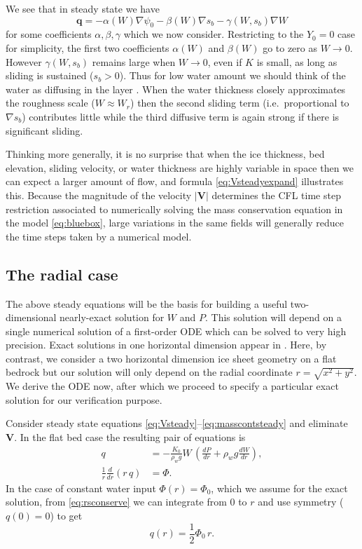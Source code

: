 \documentclass[11pt,final]{amsart}%
\newcommand\bV{\mathbf{V}}
\newcommand\bq{\mathbf{q}}
\newcommand{\grad}{\nabla}
\begin{document}
We see that in steady state we have
\begin{equation}
\bq = - \alpha(W) \grad \psi_0 - \beta(W) \grad s_b - \gamma(W,s_b) \grad W  \label{eq:qabstract}
\end{equation}
for some coefficients $\alpha,\beta,\gamma$ which we now consider.  Restricting to the $Y_0=0$ case for simplicity, the first two coefficients $\alpha(W)$ and $\beta(W)$ go to zero as $W\to 0$.  However $\gamma(W,s_b)$ remains large when $W\to 0$, even if $K$ is small, as long as sliding is sustained ($s_b > 0$).  Thus for low water amount we should think of the water as diffusing in the layer \citep[compare equation (11) in][]{BBssasliding}.  When the water thickness closely approximates the roughness scale ($W\approx W_r$) then the second sliding term (i.e.~proportional to $\grad s_b$) contributes little while the third diffusive term is again strong if there is significant sliding.

Thinking more generally, it is no surprise that when the ice thickness, bed elevation, sliding velocity, or water thickness are highly variable in space then we can expect a larger amount of flow, and formula \eqref{eq:Vsteadyexpand} illustrates this.  Because the magnitude of the velocity $|\bV|$ determines the CFL time step restriction \citep{MortonMayers} associated to numerically solving the mass conservation equation in the model \eqref{eq:bluebox}, large variations in the same fields will generally reduce the time steps taken by a numerical model.


\subsection*{The radial case}  The above steady equations will be the basis for building a useful two-dimensional nearly-exact solution for $W$ and $P$.  This solution will depend on a single numerical solution of a first-order ODE which can be solved to very high precision.  Exact solutions in one horizontal dimension appear in \cite{Schoofetal2012}.  Here, by contrast, we consider a two horizontal dimension ice sheet geometry on a flat bedrock but our solution will only depend on the radial coordinate $r = \sqrt{x^2+y^2}$.  We derive the ODE now, after which we proceed to specify a particular exact solution for our verification purpose.

Consider steady state equations \eqref{eq:Vsteady}--\eqref{eq:masscontsteady} and eliminate $\bV$.  In the flat bed case the resulting pair of equations is
\begin{align}
q &= - \frac{K_0}{\rho_w g} W\, \left(\frac{dP}{dr} + \rho_w g \frac{dW}{dr}\right), \label{eq:rsflux} \\
\frac{1}{r}\frac{d}{dr}\left(r\,q\right) &= \Phi. \label{eq:rsconserve}
\end{align}
In the case of constant water input $\Phi(r)=\Phi_0$, which we assume for the exact solution, from \eqref{eq:rsconserve} we can integrate from $0$ to $r$ and use symmetry ($q(0)=0$) to get
\begin{equation}
q(r) = \frac{1}{2} \Phi_0\, r. \label{eq:qradial}
\end{equation}
\end{document}
